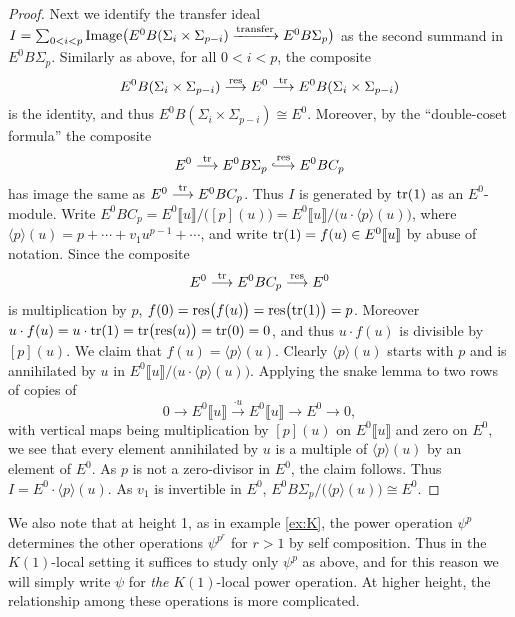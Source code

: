 \documentclass{gtpart}
\theoremstyle{definition}
\theoremstyle{remark}
\newcommand*{\longhookrightarrow}{\ensuremath{\lhook\joinrel\relbar\joinrel\rightarrow}}
\begin{document}
\begin{proof}
Next we identify the transfer ideal $I = \sum_{0<i<p} {\rm Image}\big(E^0 B(\Sigma_i\times\Sigma_{p-i}) 
\xrightarrow{\text{transfer}} E^0 B\Sigma_{p}\big)$ 
as the second summand in $E^0 B\Sigma_p$.  Similarly as above, for all 
$0 < i < p$, the composite
\[
 E^0 B(\Sigma_i \times \Sigma_{p-i}) \stackrel{\rm res}{\longrightarrow} E^0 \stackrel{\rm tr}{\longrightarrow} E^0 B(\Sigma_i \times \Sigma_{p-i})
\]
is the identity, and thus $E^0 B(\Sigma_i \times \Sigma_{p-i}) \cong E^0$.  
Moreover, by the ``double-coset formula'' the composite 
\[
 E^0 \stackrel{\rm tr}{\longrightarrow} E^0 B\Sigma_p \stackrel{\rm res}{\longhookrightarrow} E^0 BC_p
\]
has image the same as $E^0 \stackrel{\rm tr}{\longrightarrow} E^0 BC_p$.  Thus $I$ is generated by 
${\rm tr}(1)$ as an $E^0$-module.  Write $E^0 BC_p = E^0 \llbracket u \rrbracket / \big( [p](u) \big) = E^0 \llbracket u \rrbracket / \big( u \cdot \langle p \rangle(u) \big)$, 
where $\langle p \rangle(u) = p + \cdots + v_1 u^{p-1} + \cdots$, and 
write ${\rm tr}(1) = f(u) \in E^0 \llbracket u \rrbracket$ by abuse of notation.  Since the composite 
\[
 E^0 \stackrel{\rm tr}{\longrightarrow} E^0 BC_p \stackrel{\rm res}{\longrightarrow} E^0
\]
is multiplication by $p$, $f(0) = {\rm res}\big( f(u) \big) = {\rm res}\big( {\rm tr}(1) \big) = p$.  Moreover 
$u \cdot f(u) = u \cdot {\rm tr}(1) = {\rm tr}\big( {\rm res}(u) \big) = {\rm tr}(0) = 0$, and thus $u \cdot f(u)$ 
is divisible by $[p](u)$.  We claim that $f(u) = \langle p \rangle (u)$.  Clearly 
$\langle p \rangle(u)$ starts with $p$ and is annihilated by $u$ in $E^0 \llbracket u \rrbracket / \big( u \cdot \langle p \rangle(u) \big)$.  
Applying the snake lemma to two rows of copies of
\[
 0 \longrightarrow E^0 \llbracket u \rrbracket \stackrel{\cdot u}{\longrightarrow} E^0 \llbracket u \rrbracket \longrightarrow E^0 \longrightarrow 0,
\]
with vertical maps being multiplication by $[p](u)$ on $E^0 \llbracket u \rrbracket$ and zero on $E^0$, 
we see that every element annihilated by $u$ is a multiple of $\langle p \rangle(u)$ by an element of $E^0$.  
As $p$ is not a zero-divisor in $E^0$, the claim follows.  Thus $I = E^0 \cdot \langle p \rangle(u)$.  As $v_1$ is 
invertible in $E^0$, $E^0 B\Sigma_p / \big( \langle p \rangle(u) \big) \cong E^0$.
\end{proof}

We also note that at height 1, as in example \ref{ex:K}, the power 
operation $\psi^p$ determines the other operations $\psi^{p^r}$ for 
$r > 1$ by self composition.  Thus in the $K(1)$-local setting it 
suffices to study only $\psi^p$ as above, and for this reason we 
will simply write $\psi$ for {\em the} $K(1)$-local power operation.  
At higher height, the relationship among these operations is more 
complicated.  
\end{document}
